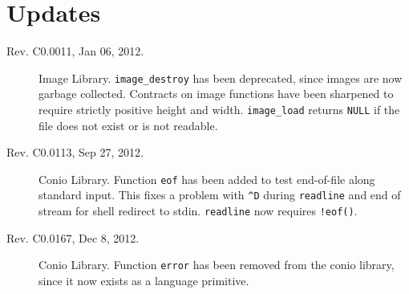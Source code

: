 \documentclass[11pt]{article}
\begin{document}
\section{Updates}
\label{sec:updates}
\hypertarget{sec:updates}{}

\begin{description}
\item[Rev. C0.0011, Jan 06, 2012.]  Image Library.
  \verb'image_destroy' has been deprecated, since images are now
  garbage collected.  Contracts on image functions have been sharpened
  to require strictly positive height and width.  \verb'image_load'
  returns \verb'NULL' if the file does not exist or is not readable.
\item[Rev. C0.0113, Sep 27, 2012.]  Conio Library.
  Function \verb'eof' has been added to test end-of-file along
  standard input.  This fixes a problem with \verb'^D' during
  \verb'readline' and end of stream for shell redirect to stdin.
  \verb'readline' now requires \verb'!eof()'.
\item[Rev. C0.0167, Dec 8, 2012.]  Conio Library.
  Function \verb'error' has been removed from the conio library, since
  it now exists as a language primitive.
\end{description}
\end{document}
